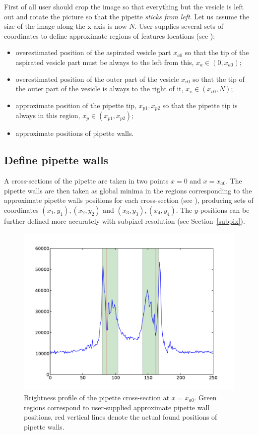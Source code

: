 First of all user should crop the image so that everything but the vesicle is left out and rotate the picture so that the pipette \emph{sticks from left}. Let us assume the size of the image along the x-axis is now $N$. User supplies several sets of coordinates to define approximate regions of features locations (see ):
\begin{itemize}
	\item overestimated position of the aspirated vesicle part $x_{a0}$ so that the tip of the aspirated vesicle part must be always to the left from this, $ x_a \in (0, x_{a0})$;
	\item overestimated position of the outer part of the vesicle $x_{v0}$ so that the tip of the outer part of the vesicle is always to the right of it, $ x_v \in (x_{v0}, N)$;
	\item approximate position of the pipette tip, $x_{p1}, x_{p2}$ so that the pipette tip is always in this region, $ x_p \in (x_{p1}, x_{p2})$;
	\item approximate positions of pipette walls.
\end{itemize}

\subsection{Define pipette walls}\label{pipwalls}
A cross-sections of the pipette are taken in two points $x=0$ and $x=x_{a0}$. The pipette walls are then taken as global minima in the regions corresponding to the approximate pipette walls positions for each cross-section (see ), producing sets of coordinates $(x_1,y_1), (x_2,y_2)$ and $(x_3,y_3), (x_4,y_4)$. The $y$-positions can be further defined more accurately with subpixel resolution (see Section~\ref{subpix}).

\begin{figure}%
	\includegraphics[width=\columnwidth]{figs/pipcrosssection.pdf}%
	\caption{Brightness profile of the pipette cross-section at $x=x_{a0}$. Green regions correspond to user-supplied approximate pipette wall positions, red vertical lines denote the actual found positions of pipette walls.}%
	\label{fig:pipcrosssection}%
\end{figure}

